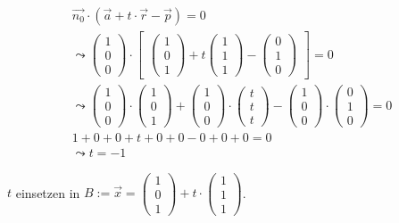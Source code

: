 \begin{gather}
\vec{n_0} \cdot (\vec{a}+t\cdot \vec{r}-\vec{p})=0\\
\leadsto 
\begin{pmatrix}
1\\0\\0
\end{pmatrix} \cdot 
\begin{bmatrix}
\begin{pmatrix}
1\\0\\1
\end{pmatrix}
+ t
\begin{pmatrix}
1\\1\\1
\end{pmatrix}
-
\begin{pmatrix}
0\\1\\0
\end{pmatrix}
\end{bmatrix} = 0\\
\leadsto
\begin{pmatrix}
1\\0\\0
\end{pmatrix}\cdot
\begin{pmatrix}
1\\0\\1
\end{pmatrix}
+
\begin{pmatrix}
1\\0\\0
\end{pmatrix}
\cdot
\begin{pmatrix}
t\\t\\t
\end{pmatrix}
-
\begin{pmatrix}
1\\0\\0
\end{pmatrix}
\cdot
\begin{pmatrix}
0\\1\\0
\end{pmatrix} =0\\
1+0+0+t+0+0-0+0+0=0\\
\leadsto t=-1
\end{gather}

\ensuremath{t} einsetzen in \ensuremath{B:= \vec{x}=\begin{pmatrix}
		1\\0\\1
	\end{pmatrix} +t\cdot\begin{pmatrix}
		1\\1\\1
\end{pmatrix}}.\\

